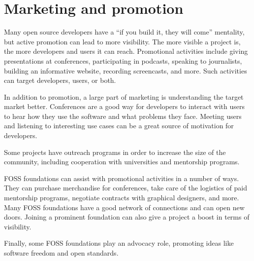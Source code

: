 


\chapter{Marketing and promotion}

Many open source developers have a ``if you build it, they will come'' mentality, but active promotion can lead to more visibility.  The more visible a project is, the more developers and users it can reach.  Promotional activities include giving presentations at conferences, participating in podcasts, speaking to journalists, building an informative website, recording screencasts, and more.  Such activities can target developers, users, or both.

In addition to promotion, a large part of marketing is understanding the target market better.  Conferences are a good way for developers to interact with users to hear how they use the software and what problems they face.  Meeting users and listening to interesting use cases can be a great source of motivation for developers.

Some projects have outreach programs in order to increase the size of the community, including cooperation with universities and mentorship programs.

FOSS foundations can assist with promotional activities in a number of ways.  They can purchase merchandise for conferences, take care of the logistics of paid mentorship programs, negotiate contracts with graphical designers, and more.  Many FOSS foundations have a good network of connections and can open new doors.  Joining a prominent foundation can also give a project a boost in terms of visibility.

Finally, some FOSS foundations play an advocacy role, promoting ideas like software freedom and open standards.

